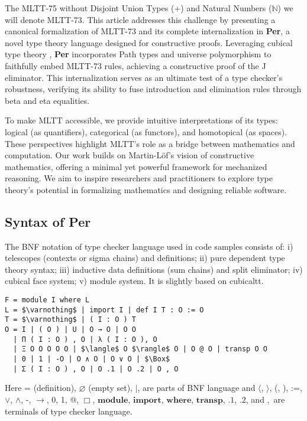\documentclass{article}
\begin{document}
The MLTT-75 without Disjoint Union Types (+) and Natural Numbers ($\mathbb{N}$) we will
denote MLTT-73. This article addresses this challenge by presenting a canonical
formalization of MLTT-73 and its complete internalization in \textbf{Per},
a novel type theory language designed for constructive proofs.
Leveraging cubical type theory \cite{Mortberg17}, \textbf{Per}
incorporates Path types and universe polymorphism to faithfully
embed MLTT-73 rules, achieving a constructive proof of the J
eliminator. This internalization serves as
an ultimate test of a type checker’s robustness, verifying its
ability to fuse introduction and elimination rules through beta and eta equalities.

To make MLTT accessible, we provide intuitive interpretations
of its types: logical (as quantifiers), categorical (as functors),
and homotopical (as spaces). These perspectives highlight MLTT’s role
as a bridge between mathematics and computation. Our work builds on
Martin-Löf’s vision of constructive mathematics, offering a minimal
yet powerful framework for mechanized reasoning. We aim to inspire
researchers and practitioners to explore type theory’s potential in
formalizing mathematics and designing reliable software.

\subsection*{Syntax of Per}
The BNF notation of type checker language used in code samples consists of:
i) telescopes (contexts or sigma chains) and definitions;
ii) pure dependent type theory syntax;
iii) inductive data definitions (sum chains) and split eliminator;
iv) cubical face system;
v) module system. It is slightly based on cubicaltt.

\begin{lstlisting}[mathescape=true]
F = module I where L
L = $\varnothing$ | import I | def I T : O := O
T = $\varnothing$ | ( I : O ) T
O = I | ( O ) | U | O → O | O O
  | Π ( I : O ) , O | λ ( I : O ), O
  | Ξ O O O O O | $\langle$ O $\rangle$ O | O @ O | transp O O
  | 0 | 1 | -O | O ∧ O | O ∨ O | $\Box$
  | Σ ( I : O ) , O | O .1 | O .2 | O , O
\end{lstlisting}

Here = (definition), $\varnothing$ (empty set), $\rvert$, are parts of BNF language and
$\langle$, $\rangle$, (, ), :=, $\vee$, $\wedge$, -, $\rightarrow$, 0, 1, @, $\Box$,
$\mathbf{module}$, $\mathbf{import}$, $\mathbf{where}$, $\mathbf{transp}$, $\mathbf{.1}$, $\mathbf{.2}$,
and $,$ are terminals of type checker language.
\end{document}
